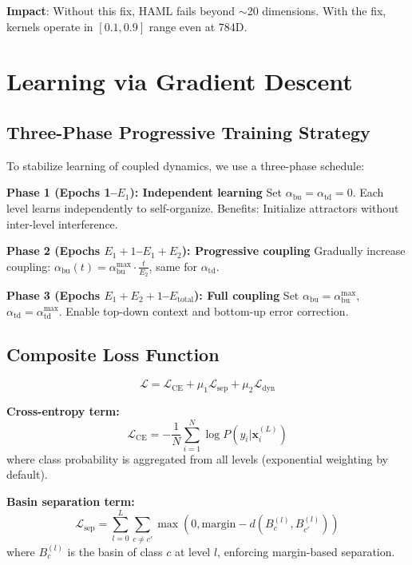 \documentclass[11pt,a4paper]{article}
\begin{document}
\textbf{Impact}: Without this fix, HAML fails beyond $\sim$20 dimensions. With the fix, kernels operate in $[0.1, 0.9]$ range even at 784D.

\section{Learning via Gradient Descent}

\subsection{Three-Phase Progressive Training Strategy}

To stabilize learning of coupled dynamics, we use a three-phase schedule:

\textbf{Phase 1 (Epochs 1–$E_1$): Independent learning}
Set $\alpha_{\text{bu}} = \alpha_{\text{td}} = 0$. Each level learns independently to self-organize. Benefits: Initialize attractors without inter-level interference.

\textbf{Phase 2 (Epochs $E_1+1$–$E_1+E_2$): Progressive coupling}
Gradually increase coupling: $\alpha_{\text{bu}}(t) = \alpha_{\text{bu}}^{\max} \cdot \frac{t}{E_2}$, same for $\alpha_{\text{td}}$.

\textbf{Phase 3 (Epochs $E_1+E_2+1$–$E_{\text{total}}$): Full coupling}
Set $\alpha_{\text{bu}} = \alpha_{\text{bu}}^{\max}$, $\alpha_{\text{td}} = \alpha_{\text{td}}^{\max}$. Enable top-down context and bottom-up error correction.

\subsection{Composite Loss Function}

\begin{equation}
\mathcal{L} = \mathcal{L}_{\text{CE}} + \mu_1 \mathcal{L}_{\text{sep}} + \mu_2 \mathcal{L}_{\text{dyn}}
\label{eq:loss}
\end{equation}

\textbf{Cross-entropy term:}
\begin{equation}
\mathcal{L}_{\text{CE}} = -\frac{1}{N} \sum_{i=1}^{N} \log P(y_i | \mathbf{x}_i^{(L)})
\end{equation}
where class probability is aggregated from all levels (exponential weighting by default).

\textbf{Basin separation term:}
\begin{equation}
\mathcal{L}_{\text{sep}} = \sum_{l=0}^{L} \sum_{c \ne c'} \max(0, \text{margin} - d(B_c^{(l)}, B_{c'}^{(l)}))
\end{equation}
where $B_c^{(l)}$ is the basin of class $c$ at level $l$, enforcing margin-based separation.
\end{document}
